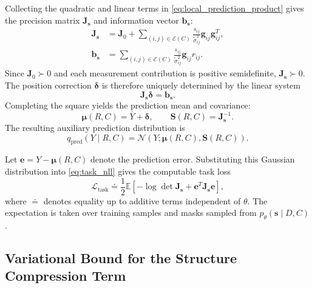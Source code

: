 Collecting the quadratic and linear terms in \eqref{eq:local_prediction_product} gives the precision matrix $\mathbf J_{\mathbf s}$ and information vector $\mathbf b_{\mathbf s}$:
\begin{equation}
    \begin{aligned}
    \mathbf J_{\mathbf s}
    &=
    \mathbf J_0+
    \sum_{(i,j)\in\mathcal E(C)}
    \frac{s_{ij}}{\widetilde\sigma_{ij}^{2}}
    \mathbf g_{ij}\mathbf g_{ij}^{T},\\
    \mathbf b_{\mathbf s}
    &=
    \sum_{(i,j)\in\mathcal E(C)}
    \frac{s_{ij}}{\widetilde\sigma_{ij}^{2}}
    \mathbf g_{ij}r_{ij}.
    \end{aligned}
    \label{eq:prediction_precision}
\end{equation}
Since $\mathbf J_0\succ0$ and each measurement contribution is positive semidefinite, $\mathbf J_{\mathbf s}\succ0$. The position correction $\boldsymbol\delta$ is therefore uniquely determined by the linear system
\begin{equation}
    \mathbf J_{\mathbf s}\boldsymbol\delta
    =
    \mathbf b_{\mathbf s}.
    \label{eq:prediction_update}
\end{equation}
Completing the square yields the prediction mean and covariance:
\[
    \boldsymbol\mu(R,C)=\bar Y+\boldsymbol\delta,
    \qquad
    \mathbf S(R,C)=\mathbf J_{\mathbf s}^{-1}.
\]
The resulting auxiliary prediction distribution is
\begin{equation}
    q_{\mathrm{pred}}(Y\mid R,C)
    =
    \mathcal N\!\left(
    Y;\boldsymbol\mu(R,C),\mathbf S(R,C)
    \right).
    \label{eq:prediction_distribution}
\end{equation}

Let $\mathbf e=Y-\boldsymbol\mu(R,C)$ denote the prediction error. Substituting this Gaussian distribution into \eqref{eq:task_nll} gives the computable task loss
\begin{equation}
    \mathcal L_{\mathrm{task}}
    \doteq
    \frac12\mathbb E
    \left[
    -\log\det\mathbf J_{\mathbf s}
    +\mathbf e^{T}\mathbf J_{\mathbf s}\mathbf e
    \right],
    \label{eq:linear_task_loss}
\end{equation}
where $\doteq$ denotes equality up to additive terms independent of $\theta$. The expectation is taken over training samples and masks sampled from $p_\theta(\mathbf s\mid D,C)$.

\subsection{Variational Bound for the Structure Compression Term}
\label{sec:structured_prior}

